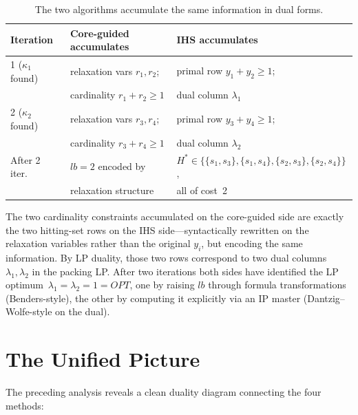 \documentclass[11pt,a4paper]{article}
\begin{document}
\begin{table}[h]
\centering
\caption{The two algorithms accumulate the same information in dual forms.}
\label{tab:trace}
\begin{tabular}{lll}
\toprule
\textbf{Iteration} & \textbf{Core-guided accumulates} & \textbf{IHS accumulates} \\
\midrule
1 ($\kappa_1$ found) & relaxation vars $r_1, r_2$;     & primal row $y_1 + y_2 \geq 1$;     \\
                     & cardinality $r_1 + r_2 \geq 1$  & dual column $\lambda_1$            \\
2 ($\kappa_2$ found) & relaxation vars $r_3, r_4$;     & primal row $y_3 + y_4 \geq 1$;     \\
                     & cardinality $r_3 + r_4 \geq 1$  & dual column $\lambda_2$            \\
\midrule
After 2 iter.\ & $\mathit{lb} = 2$ encoded by         & $H^* \in \{ \{s_1,s_3\}, \{s_1,s_4\}, \{s_2,s_3\}, \{s_2,s_4\} \}$, \\
               & relaxation structure                  & all of cost~2 \\
\bottomrule
\end{tabular}
\end{table}

The two cardinality constraints accumulated on the core-guided side are
exactly the two hitting-set rows on the IHS side---syntactically rewritten on
the relaxation variables rather than the original $y_i$, but encoding the
same information. By LP duality, those two rows correspond to two dual
columns $\lambda_1, \lambda_2$ in the packing LP. After two iterations both
sides have identified the LP optimum~$\lambda_1 = \lambda_2 = 1 = \mathit{OPT}$,
one by raising $\mathit{lb}$ through formula transformations (Benders-style),
the other by computing it explicitly via an IP master (Dantzig--Wolfe-style on
the dual).

\section{The Unified Picture}
\label{sec:unified}

The preceding analysis reveals a clean duality diagram connecting the four
methods:
\end{document}
